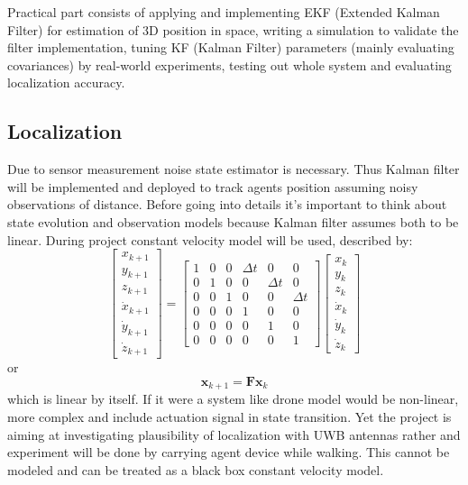 Practical part consists of applying and implementing EKF (Extended Kalman Filter) for estimation of 3D position in space, writing a simulation to validate the filter implementation, tuning KF (Kalman Filter) parameters (mainly evaluating covariances) by real-world experiments, testing out whole system and evaluating localization accuracy.

\subsection{Localization}

Due to sensor measurement noise state estimator is necessary. Thus Kalman filter will be implemented and deployed to track agents position assuming noisy observations of distance. Before going into details it's important to think about state evolution and observation models because Kalman filter assumes both to be linear. During project constant velocity model will be used, described by:
$$
\left[\begin{array}{c}
x_{k+1} \\
y_{k+1} \\
z_{k+1} \\
\dot{x}_{k+1} \\
\dot{y}_{k+1} \\
\dot{z}_{k+1}
\end{array}\right]=\left[\begin{array}{cccccc}
1 & 0 & 0 & \Delta t & 0 & 0 \\
0 & 1 & 0 & 0 & \Delta t & 0 \\
0 & 0 & 1 & 0 & 0 & \Delta t \\
0 & 0 & 0 & 1 & 0 & 0 \\
0 & 0 & 0 & 0 & 1 & 0 \\
0 & 0 & 0 & 0 & 0 & 1
\end{array}\right]\left[\begin{array}{c}
x_{k} \\
y_{k} \\
z_{k} \\
\dot{x}_{k} \\
\dot{y}_{k} \\
\dot{z}_{k}
\end{array}\right]
$$
or
$$
\boldsymbol{x}_{k+1} = \boldsymbol{F} \boldsymbol{x}_k
$$
which is linear by itself. If it were a system like drone model would be non-linear, more complex and include actuation signal in state transition. Yet the project is aiming at investigating plausibility of localization with UWB antennas rather and experiment will be done by carrying agent device while walking. This cannot be modeled and can be treated as  a black box constant velocity model.

